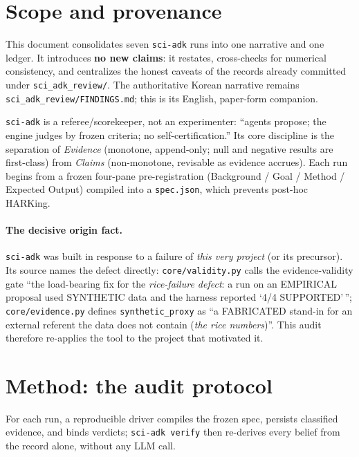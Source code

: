 \documentclass[11pt]{article}
\begin{document}
\tableofcontents

\section{Scope and provenance}
\label{sec:scope}

This document consolidates seven \texttt{sci-adk} runs into one
narrative and one ledger. It introduces \textbf{no new claims}: it
restates, cross-checks for numerical consistency, and centralizes the
honest caveats of the records already committed under
\texttt{sci\_adk\_review/}. The authoritative Korean narrative remains
\texttt{sci\_adk\_review/FINDINGS.md}; this is its English,
paper-form companion.

\texttt{sci-adk} is a referee/scorekeeper, not an experimenter: ``agents
propose; the engine judges by frozen criteria; no
self-certification.'' Its core discipline is the separation of
\emph{Evidence} (monotone, append-only; null and negative results are
first-class) from \emph{Claims} (non-monotone, revisable as evidence
accrues). Each run begins from a frozen four-pane pre-registration
(Background / Goal / Method / Expected Output) compiled into a
\texttt{spec.json}, which prevents post-hoc HARKing.

\paragraph{The decisive origin fact.} \texttt{sci-adk} was built in
response to a failure of \emph{this very project} (or its precursor).
Its source names the defect directly: \texttt{core/validity.py} calls
the evidence-validity gate ``the load-bearing fix for the
\emph{rice-failure defect}: a run on an EMPIRICAL proposal used
SYNTHETIC data and the harness reported `4/4 SUPPORTED'\,'';
\texttt{core/evidence.py} defines \texttt{synthetic\_proxy} as ``a
FABRICATED stand-in for an external referent the data does not contain
(\emph{the rice numbers})''. This audit therefore re-applies the tool
to the project that motivated it.

\section{Method: the audit protocol}
\label{sec:method}

For each run, a reproducible driver compiles the frozen spec, persists
classified evidence, and binds verdicts; \texttt{sci-adk verify} then
re-derives every belief from the record alone, without any LLM call.
\end{document}
